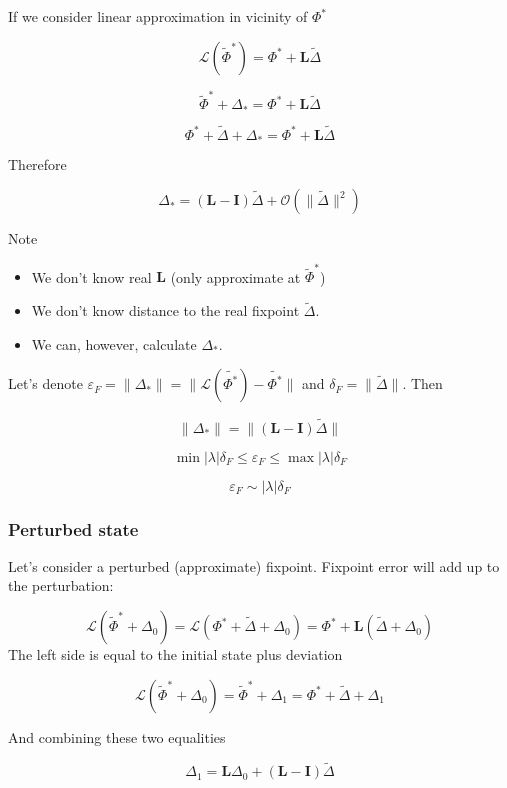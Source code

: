 \documentclass[a4paper,10pt]{article}
\newcommand*{\wt}{\widetilde} %
\newcommand*{\FP}{\Phi^*}%
\newcommand*{\D}{\Delta}%
\begin{document}
\begin{appendices}
If we consider linear approximation in vicinity of $\FP$


$$ \mathcal{L}(\wt \FP) = \FP + \mathbf{L}  \wt{\D}$$

$$ \wt \FP + \D_* = \FP + \mathbf{L}  \wt{\D}$$

$$  \FP + \wt{\D} + \D_* = \FP + \mathbf{L}  \wt{\D}$$

Therefore

\begin{equation}
\D_* = ( \mathbf{L} - \mathbf{I} ) \wt{\D} + \mathcal{O}(\lVert \wt{\D} \rVert^2)
\label{eqn:delta-star}
\end{equation}



Note
\begin{itemize}

\item We don't know real $\mathbf{L}$ (only approximate at $\wt \FP$)
\item We don't know distance to the real fixpoint $\wt{\D}$.
\item We can, however, calculate $\D_*$.

\end{itemize}

Let's denote
 $\varepsilon_{F}
 = \lVert \D_* \rVert
 =\lVert \mathcal{L}(\wt{\FP}) - \wt{\FP}  \rVert$
and $\delta_F = \lVert \wt{\D} \rVert $. Then

$$
\lVert \D_* \rVert = \lVert ( \mathbf{L} - \mathbf{I} ) \wt{\D} \rVert
$$


$$
\min|\lambda| \delta_F
\leq \varepsilon_{F}
\leq \max|\lambda| \delta_F
$$

$$
\varepsilon_{F} \sim |\lambda| \delta_F
$$



\subsubsection{Perturbed state}
Let's consider a perturbed (approximate) fixpoint. Fixpoint error will add up to the perturbation:

$$
\mathcal{L}(\wt{\Phi}^* + \D_0)
= \mathcal{L}(\FP + \wt  \D +  \D_0 )
= \FP +  \mathbf{L}  ( \wt{\D} +  \D_0 )
$$
The left side is equal to the initial state plus deviation

$$
\mathcal{L}(\wt \FP  + \D_0)
= \wt \FP + \D_1
= \FP + \wt{\D}  + \D_1
$$

And combining these two equalities

$$
\D_1
=  \mathbf{L}   \D_0  + (\mathbf{L} - \mathbf{I}) \wt{\D}
$$


\end{appendices}
\end{document}
